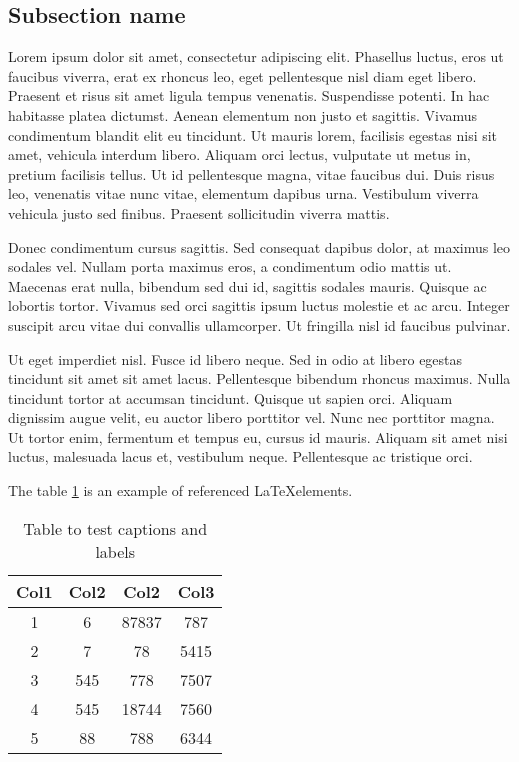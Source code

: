 \subsection{Subsection name}
Lorem ipsum dolor sit amet, consectetur adipiscing elit. Phasellus luctus, eros ut faucibus viverra, erat ex rhoncus leo, eget pellentesque nisl diam eget libero. Praesent et risus sit amet ligula tempus venenatis. Suspendisse potenti. In hac habitasse platea dictumst. Aenean elementum non justo et sagittis. Vivamus condimentum blandit elit eu tincidunt. Ut mauris lorem, facilisis egestas nisi sit amet, vehicula interdum libero. Aliquam orci lectus, vulputate ut metus in, pretium facilisis tellus. Ut id pellentesque magna, vitae faucibus dui. Duis risus leo, venenatis vitae nunc vitae, elementum dapibus urna. Vestibulum viverra vehicula justo sed finibus. Praesent sollicitudin viverra mattis.

Donec condimentum cursus sagittis. Sed consequat dapibus dolor, at maximus leo sodales vel. Nullam porta maximus eros, a condimentum odio mattis ut. Maecenas erat nulla, bibendum sed dui id, sagittis sodales mauris. Quisque ac lobortis tortor. Vivamus sed orci sagittis ipsum luctus molestie et ac arcu. Integer suscipit arcu vitae dui convallis ullamcorper. Ut fringilla nisl id faucibus pulvinar.

Ut eget imperdiet nisl. Fusce id libero neque. Sed in odio at libero egestas tincidunt sit amet sit amet lacus. Pellentesque bibendum rhoncus maximus. Nulla tincidunt tortor at accumsan tincidunt. Quisque ut sapien orci. Aliquam dignissim augue velit, eu auctor libero porttitor vel. Nunc nec porttitor magna. Ut tortor enim, fermentum et tempus eu, cursus id mauris. Aliquam sit amet nisi luctus, malesuada lacus et, vestibulum neque. Pellentesque ac tristique orci.

The table \ref{table:1} is an example of referenced \LaTeX elements.

\begin{table}[h!]
	\centering
	\begin{tabular}{||c c c c||} 
		\hline
		Col1 & Col2 & Col2 & Col3 \\ [0.5ex] 
		\hline\hline
		1 & 6 & 87837 & 787 \\ 
		2 & 7 & 78 & 5415 \\
		3 & 545 & 778 & 7507 \\
		4 & 545 & 18744 & 7560 \\
		5 & 88 & 788 & 6344 \\ [1ex] 
		\hline
	\end{tabular}
	\caption{Table to test captions and labels}
	\label{table:1}
\end{table}

